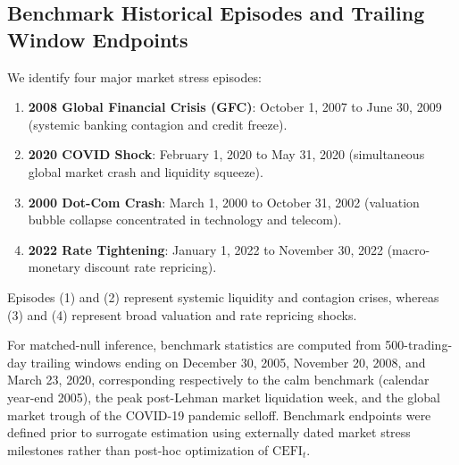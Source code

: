 \documentclass[review,12pt,authoryear]{elsarticle}
\begin{document}
\subsection{Benchmark Historical Episodes and Trailing Window Endpoints}
We identify four major market stress episodes:
\begin{enumerate}
    \item \textbf{2008 Global Financial Crisis (GFC)}: October 1, 2007 to June 30, 2009 (systemic banking contagion and credit freeze).
    \item \textbf{2020 COVID Shock}: February 1, 2020 to May 31, 2020 (simultaneous global market crash and liquidity squeeze).
    \item \textbf{2000 Dot-Com Crash}: March 1, 2000 to October 31, 2002 (valuation bubble collapse concentrated in technology and telecom).
    \item \textbf{2022 Rate Tightening}: January 1, 2022 to November 30, 2022 (macro-monetary discount rate repricing).
\end{enumerate}
Episodes (1) and (2) represent systemic liquidity and contagion crises, whereas (3) and (4) represent broad valuation and rate repricing shocks.

For matched-null inference, benchmark statistics are computed from 500-trading-day trailing windows ending on December 30, 2005, November 20, 2008, and March 23, 2020, corresponding respectively to the calm benchmark (calendar year-end 2005), the peak post-Lehman market liquidation week, and the global market trough of the COVID-19 pandemic selloff. Benchmark endpoints were defined prior to surrogate estimation using externally dated market stress milestones rather than post-hoc optimization of $\mathrm{CEFI}_t$.
\end{document}
